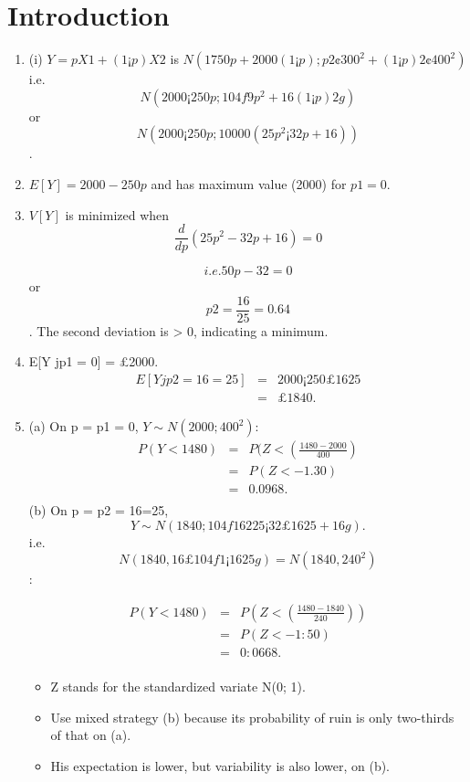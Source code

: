 \documentclass[a4paper,12pt]{article}
\begin{document}
\section{Introduction}
\begin{enumerate}
\item (i) $Y = pX1 + (1 ¡ p)X2$ is $N(1750p + 2000(1 ¡ p); p2 ¢ 300^2 + (1 ¡ p)2 ¢ 400^2)$
i.e. \[N(2000 ¡ 250p; 104f9p^2 + 16(1 ¡ p)2g)\]
or \[N(2000 ¡ 250p; 10000(25p^2 ¡ 32p + 16))\].
\item $E[Y ] = 2000 - 250p$ and has maximum value (2000) for $p1 = 0$.
\item $V[Y]$ is minimized when 
\[ \frac{d}{dp}(25p^2 - 32p + 16) =0\]

\[i.e. 50p - 32 = 0\] or \[p2 = \frac{16}{25}=0.64\].
The second deviation is > 0, indicating a minimum.
\item  E[Y jp1 = 0] = £2000. 
\begin{eqnarray*}
E[Y jp2 = 16=25] &=& 2000 ¡ 250£16
25\\ &=& £1840.
\end{eqnarray*}
\item  (a) On p = p1 = 0, $Y \sim N(2000; 400^2)$:
\begin{eqnarray*}
P(Y < 1480) &=& P(Z < \left( \frac{1480-2000}{400}
\right) \\
&=& P(Z < -1.30)\\ 
&=& 0.0968.\\
\end{eqnarray*}
(b) On p = p2 = 16=25, 
\[Y \sim N(1840; 104f162
25 ¡ 32£16
25 + 16g).\]
i.e. \[N(1840, 16 £ 104f1 ¡ 16
25g) = N(1840, 240^2)\]:


\begin{eqnarray*}
P(Y < 1480) &=& P\left(Z < \left( \frac{1480-1840}{240} \right)
\right) \\
&=& P(Z < -1:50)\\ 
&=& 0:0668.\\
\end{eqnarray*}

\begin{itemize}
    \item Z stands for the standardized variate N(0; 1).
    \item Use mixed strategy (b) because
its probability of ruin is only two-thirds of that on (a).
\item His expectation
is lower, but variability is also lower, on (b).
\end{itemize}

\end{enumerate}
\end{document}
